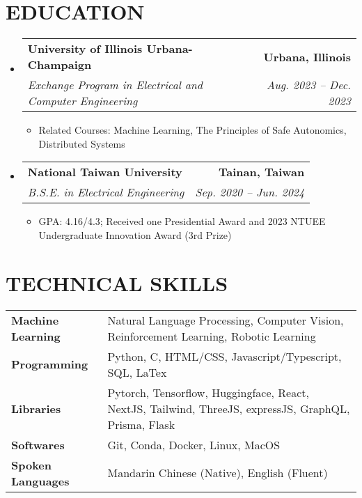 \documentclass[letterpaper,8pt]{article}
\makeatletter
\newcommand{\resumeItem}[1]{
  \item\small{
    {#1 \vspace{-2pt}}
  }
}
\newcommand{\resumeSubheading}[4]{
    \item
    \begin{tabular*}{1.0\textwidth}[t]{l@{\extracolsep{\fill}}r}
      \textbf{#1} & \textbf{\small #2} \\
      \textit{\small#3} & \textit{\small #4} \\
    \end{tabular*}\vspace{-7pt}
}
\newcommand{\resumeSubHeadingListStart}{\begin{itemize}[leftmargin=0.0in, label={}]}
\newcommand{\resumeSubHeadingListEnd}{\end{itemize}}
\newcommand{\resumeItemListStart}{\begin{itemize}}
\newcommand{\resumeItemListEnd}{\end{itemize}\vspace{-5pt}}
\makeatother
\begin{document}
\section{EDUCATION}
  \resumeSubHeadingListStart
    \resumeSubheading
      {University of Illinois Urbana-Champaign}{Urbana, Illinois}
      {Exchange Program in Electrical and Computer Engineering}{\textnormal{Aug. 2023 -- Dec. 2023}}
      \resumeItemListStart
        \resumeItem{Related Courses: Machine Learning, The Principles of Safe Autonomics, Distributed Systems}
      \resumeItemListEnd
    \resumeSubheading
      {National Taiwan University}{Tainan, Taiwan}
      {B.S.E. in Electrical Engineering}{\textnormal{Sep. 2020 -- Jun. 2024}}
        \resumeItemListStart
        \resumeItem{GPA: 4.16/4.3; Received one Presidential Award and 2023 NTUEE Undergraduate Innovation Award (3rd Prize)}
        \resumeItemListEnd
  \resumeSubHeadingListEnd
\vspace{-10pt}



\section{TECHNICAL SKILLS}

\small{
  \begin{tabularx}{\linewidth}{@{} p{3.2cm} X @{}}
    \textbf{Machine Learning} & Natural Language Processing, Computer Vision, Reinforcement Learning, Robotic Learning \\
    \textbf{Programming} & Python, C, HTML/CSS, Javascript/Typescript, SQL, LaTex \\
    \textbf{Libraries} & Pytorch, Tensorflow, Huggingface, React, NextJS, Tailwind, ThreeJS, expressJS, GraphQL, Prisma, Flask \\
    \textbf{Softwares} & Git, Conda, Docker, Linux, MacOS \\
    \textbf{Spoken Languages} & Mandarin Chinese (Native), English (Fluent) \\
  \end{tabularx}
  }
  \vspace{-10pt}
\end{document}
